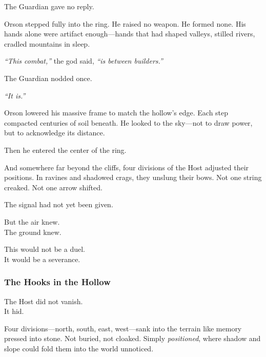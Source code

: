 \documentclass[12pt]{article}
\begin{document}
\vspace{0.5em}
The Guardian gave no reply.

\vspace{0.5em}
Orson stepped fully into the ring. He raised no weapon. He formed none. His hands alone were artifact enough---hands that had shaped valleys, stilled rivers, cradled mountains in sleep.

\vspace{0.5em}
\textit{``This combat,''} the god said, \textit{``is between builders.''}

\vspace{0.5em}
The Guardian nodded once.

\vspace{0.5em}
\textit{``It is.''}

\vspace{0.5em}
Orson lowered his massive frame to match the hollow’s edge. Each step compacted centuries of soil beneath. He looked to the sky---not to draw power, but to acknowledge its distance.

\vspace{0.5em}
Then he entered the center of the ring.

\vspace{0.5em}
And somewhere far beyond the cliffs, four divisions of the Host adjusted their positions. In ravines and shadowed crags, they unslung their bows. Not one string creaked. Not one arrow shifted.

\vspace{0.5em}
The signal had not yet been given.

\vspace{0.5em}
But the air knew.\\
The ground knew.

\vspace{0.5em}
This would not be a duel.\\
It would be a severance.


\dotfill

\subsubsection*{The Hooks in the Hollow}

The Host did not vanish.\\
It hid.

\vspace{0.5em}
Four divisions---north, south, east, west---sank into the terrain like memory pressed into stone. Not buried, not cloaked. Simply \textit{positioned}, where shadow and slope could fold them into the world unnoticed.
\end{document}
